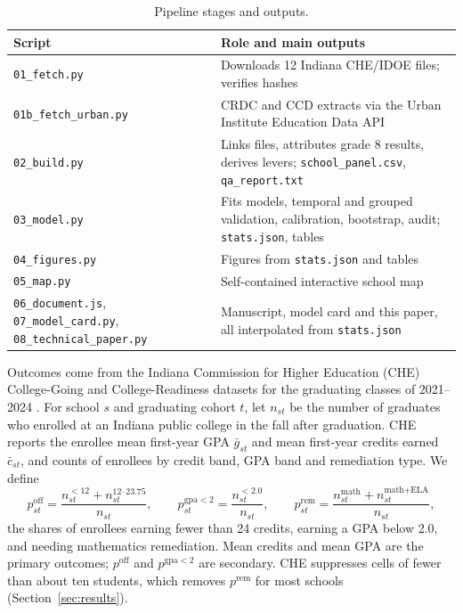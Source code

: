 \documentclass[11pt]{article}
\newcommand{\subsec}[1]{\par\vspace{1.6ex}\noindent{\large\bfseries #1}\par\vspace{0.8ex}\noindent\ignorespaces}
\newcommand{\code}[1]{\texttt{#1}}
\begin{document}
\begin{table}[t]
\centering
\caption{Pipeline stages and outputs.}\label{tab:pipeline}
\small
\begin{tabular}{@{}>{\raggedright\arraybackslash}p{4.2cm} >{\raggedright\arraybackslash}p{6.6cm}@{}}
\toprule
Script & Role and main outputs \\
\midrule
\code{01\_fetch.py} & Downloads 12 Indiana CHE/IDOE files; verifies hashes \\
\code{01b\_fetch\_urban.py} & CRDC and CCD extracts via the Urban Institute Education Data API \\
\code{02\_build.py} & Links files, attributes grade 8 results, derives levers; \code{school\_panel.csv}, \code{qa\_report.txt} \\
\code{03\_model.py} & Fits models, temporal and grouped validation, calibration, bootstrap, audit; \code{stats.json}, tables \\
\code{04\_figures.py} & Figures from \code{stats.json} and tables \\
\code{05\_map.py} & Self-contained interactive school map \\
\code{06\_document.js}, \code{07\_model\_card.py}, \code{08\_technical\_paper.py} & Manuscript, model card and this paper, all interpolated from \code{stats.json} \\
\bottomrule
\end{tabular}
\end{table}

\subsec{Outcomes}
Outcomes come from the Indiana Commission for Higher Education (CHE) College-Going and College-Readiness datasets for the graduating classes of 2021--2024 \citep{che2026}. For school $s$ and graduating cohort $t$, let $n_{st}$ be the number of graduates who enrolled at an Indiana public college in the fall after graduation. CHE reports the enrollee mean first-year GPA $\bar g_{st}$ and mean first-year credits earned $\bar c_{st}$, and counts of enrollees by credit band, GPA band and remediation type. We define
\begin{equation}
p^{\text{off}}_{st} = \frac{n^{<12}_{st} + n^{12\text{--}23.75}_{st}}{n_{st}},\qquad
p^{\text{gpa}<2}_{st} = \frac{n^{<2.0}_{st}}{n_{st}},\qquad
p^{\text{rem}}_{st} = \frac{n^{\text{math}}_{st} + n^{\text{math+ELA}}_{st}}{n_{st}},
\end{equation}
the shares of enrollees earning fewer than 24 credits, earning a GPA below 2.0, and needing mathematics remediation. Mean credits and mean GPA are the primary outcomes; $p^{\text{off}}$ and $p^{\text{gpa}<2}$ are secondary. CHE suppresses cells of fewer than about ten students, which removes $p^{\text{rem}}$ for most schools (Section~\ref{sec:results}).
\end{document}
